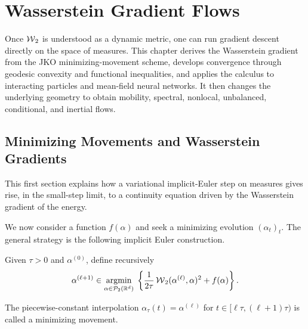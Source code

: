 
\chapter{Wasserstein Gradient Flows}
\label{sec-wasserstein-gradient-flows}

Once $\operatorname{\mathcal{W}}_2$ is understood as a dynamic metric, one can run gradient descent directly on the space of measures. This chapter derives the Wasserstein gradient from the JKO minimizing-movement scheme, develops convergence through geodesic convexity and functional inequalities, and applies the calculus to interacting particles and mean-field neural networks. It then changes the underlying geometry to obtain mobility, spectral, nonlocal, unbalanced, conditional, and inertial flows.

\section{Minimizing Movements and Wasserstein Gradients}

This first section explains how a variational implicit-Euler step on measures gives rise, in the small-step limit, to a continuity equation driven by the Wasserstein gradient of the energy.

We now consider a function $f(\alpha)$ and seek a minimizing evolution $(\alpha_t)_t$. The general strategy is the following implicit Euler construction.
\begin{defn}\label{def-jko-minimizing-movement}
Given $\tau>0$ and $\alpha^{(0)}$, define recursively
\begin{equation}
    \alpha^{(\ell+1)} \in \underset{\alpha\in\mathcal{P}_2(\mathbb{R}^d)}{\operatorname{argmin}}\;
    \left\{\frac{1}{2 \tau} \operatorname{\mathcal{W}}_2(\alpha^{(\ell)}, \alpha)^2 + f(\alpha)\right\}. \label{eq:jko-discr}
\end{equation}
\end{defn}
The piecewise-constant interpolation $\alpha_\tau(t)=\alpha^{(\ell)}$ for $t\in[\ell\tau,(\ell+1)\tau)$ is called a minimizing movement.


